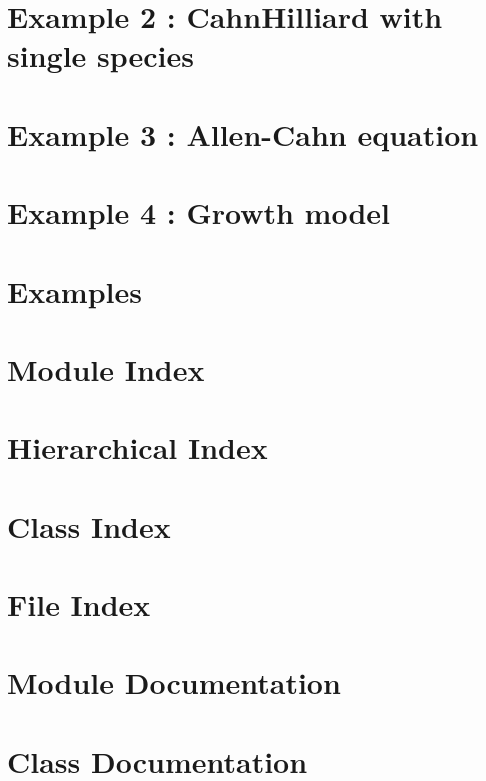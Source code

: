 \documentclass[twoside]{book}
\begin{document}
\chapter{Example 2 \-: Cahn\-Hilliard with single species}
\label{_cahn_hilliard}

\chapter{Example 3 \-: Allen-\/\-Cahn equation}
\label{_allen__cahn}

\chapter{Example 4 \-: Growth model}
\label{growth}

\chapter{Examples}
\label{examples}

\chapter{Module Index}

\chapter{Hierarchical Index}

\chapter{Class Index}

\chapter{File Index}

\chapter{Module Documentation}


\chapter{Class Documentation}











\end{document}
